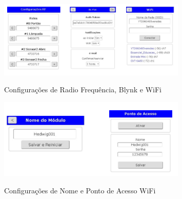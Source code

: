 \begin{figure}[H]
	\centering
	\caption{Configurações de Radio Frequência, Blynk e WiFi}
	\includegraphics[width=0.8\textwidth]{configRFBlynkWiFi}
	\label{fig:configRFBlynkWiFi}
\end{figure}

\begin{figure}[H]
	\centering
	\caption{Configurações de Nome e Ponto de Acesso WiFi}
	\includegraphics[width=0.8\textwidth]{confignomeptoacessoWiFi}
	\label{fig:confignomeptoacessoWiFi}
\end{figure}